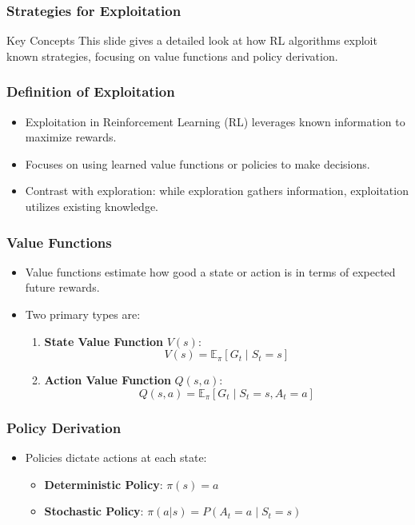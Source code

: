 \documentclass[aspectratio=169]{beamer}
\begin{document}
\begin{frame}[fragile]
  \frametitle{Strategies for Exploitation}
  \begin{block}{Key Concepts}
    This slide gives a detailed look at how RL algorithms exploit known strategies, focusing on value functions and policy derivation.
  \end{block}
\end{frame}

\begin{frame}[fragile]
  \frametitle{Definition of Exploitation}
  \begin{itemize}
    \item Exploitation in Reinforcement Learning (RL) leverages known information to maximize rewards.
    \item Focuses on using learned value functions or policies to make decisions.
    \item Contrast with exploration: while exploration gathers information, exploitation utilizes existing knowledge.
  \end{itemize}
\end{frame}

\begin{frame}[fragile]
  \frametitle{Value Functions}
  \begin{itemize}
    \item Value functions estimate how good a state or action is in terms of expected future rewards.
    \item Two primary types are:
      \begin{enumerate}
        \item \textbf{State Value Function} \( V(s) \):
        \begin{equation}
          V(s) = \mathbb{E}_\pi \left[ G_t \mid S_t = s \right]
        \end{equation}
        \item \textbf{Action Value Function} \( Q(s, a) \):
        \begin{equation}
          Q(s, a) = \mathbb{E}_\pi \left[ G_t \mid S_t = s, A_t = a \right]
        \end{equation}
      \end{enumerate}
  \end{itemize}
\end{frame}

\begin{frame}[fragile]
  \frametitle{Policy Derivation}
  \begin{itemize}
    \item Policies dictate actions at each state:
      \begin{itemize}
        \item \textbf{Deterministic Policy}: \( \pi(s) = a \)
        \item \textbf{Stochastic Policy}: \( \pi(a|s) = P(A_t = a \mid S_t = s) \)
      \end{itemize}
  \end{itemize}
\end{frame}
\end{document}
